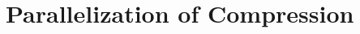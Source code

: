 \documentclass[a4paper,UKenglish,cleveref, autoref, thm-restate,anonymous]{lipics-v2021}
\begin{document}
\section{Parallelization of Compression}\label{sec:appendix:parallelization}






\end{document}
